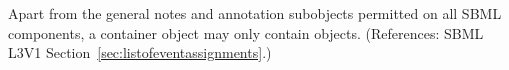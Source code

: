 Apart from the general notes and annotation subobjects permitted on all
SBML components, a \ListOfEventAssignments container object may only
contain \EventAssignment objects.  (References: SBML L3V1
Section~\ref{sec:listofeventassignments}.)
